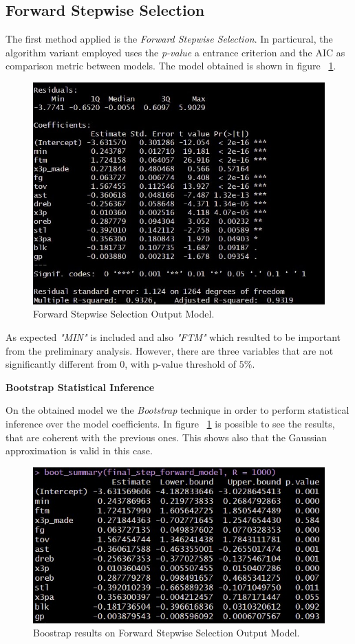 \subsection{Forward Stepwise Selection}

The first method applied is the \textit{Forward Stepwise Selection}. In particural, the algorithm variant employed uses the \textit{p-value} a entrance criterion and the AIC as comparison metric between models. The model obtained is shown in figure \Fig~\ref{fig:ForwardModelSummary}.
\begin{figure}[h]
	\centering
	\includegraphics[width=0.4\linewidth]{ImageFiles/Regression/Forward/ForwardModelSummary}
	\caption{Forward Stepwise Selection Output Model.}
	\label{fig:ForwardModelSummary}
\end{figure}

As expected \textit{"MIN"} is included and also \textit{"FTM"} which resulted to be important from the preliminary analysis. However, there are three variables that are not significantly different from 0, with p-value threshold of $5\%$.

\vspace{0.2cm}
\textbf{Bootstrap Statistical Inference}

On the obtained model we the \textit{Bootstrap} technique in order to perform statistical inference over the model coefficients. In figure \Fig~\ref{fig:ForwardModelSummary} is possible to see the results, that are coherent with the previous ones. This shows also that the Gaussian approximation is valid in this case.
\begin{figure}[h]
	\centering
	\includegraphics[width=0.4\linewidth]{ImageFiles/Regression/Forward/BootForwardModel}
	\caption{Boostrap results on Forward Stepwise Selection Output Model.}
	\label{fig:BootForwardModel}
\end{figure}

